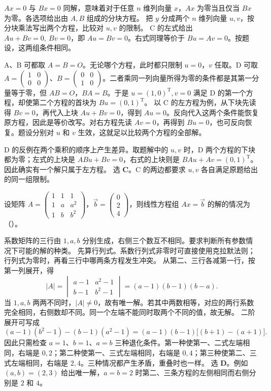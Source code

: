\documentclass[UTF8,zihao=-4,fontset=fandol]{ctexart}
\begin{document}
\Solution
\Known $Ax=0$ 与 $Bx=0$ 同解，意味着对于任意 $n$ 维列向量 $x$，$Ax$ 为零当且仅当 $Bx$ 为零。各选项给出由 $A,B$ 组成的分块方程。
\Method 把 $y$ 分成两个 $n$ 维列向量 $u,v$，按分块乘法写出两个方程，比较对 $u,v$ 的限制。
\Derive C 的左式给出 $Au+Bv=0,\ Bv=0$，即 $Au=Bv=0$。右式同理等价于 $Bu=Av=0$。按题设，这两组条件相同。

A、B 可都取 $A=B=O$。无论哪个方程，此时都只限制 $u=0$，$v$ 任取。D 可取 $A=\begin{pmatrix}1&0\\0&0\end{pmatrix}$、$B=\begin{pmatrix}0&0\\1&0\end{pmatrix}$。二者乘同一列向量所得为零的条件都是其第一分量等于零，但 $AB=O$，$BA=B$。于是 $u=(1,0)^{\mathrm T},v=0$ 满足 D 的第一个方程，却使第二个方程的首块为 $Bu=(0,1)^{\mathrm T}$。
以 C 的左方程为例，从下块先读得 $Bv=0$，再代入上块 $Au+Bv=0$，得到 $Au=0$。反向代入这两个条件能恢复原方程，因此是等价改写。对右方程先读 $Av=0$，再得到 $Bu=0$，也可反向恢复。题设分别对 $u$ 和 $v$ 生效，这就足以比较两个方程的全部解。

D 的反例在两个乘积的顺序上产生差异。取题解中的 $u,v$ 时，D 两个方程的下块都为零；左式的上块是 $ABu+Bv=0$，右式的上块则是 $BAu+Av=(0,1)^{\mathrm T}$。因此确实有一个解只属于左方程。
\Verify 选 \textbf{C}。C 的两边都要求 $u,v$ 各自满足原题给出的同一组限制。

设矩阵 $A=\begin{pmatrix}1&1&1\\1&a&a^2\\1&b&b^2\end{pmatrix}$，$\vec b=\begin{pmatrix}0\\2\\4\end{pmatrix}$，则线性方程组 $Ax=\vec b$ 的解的情况为（\quad）。

\Solution
\Known 系数矩阵的三行由 $1,a,b$ 分别生成，右侧三个数互不相同。要求判断所有参数情况下可能的解的种类。
\Method 先算行列式。系数行列式非零时可直接使用克拉默法则；行列式为零时，再看三行中哪两条方程发生冲突。
\Derive 从第二、三行各减第一行，按第一列展开，得
\[
|A|=\begin{vmatrix}a-1&a^2-1\\ b-1&b^2-1\end{vmatrix}
=(a-1)(b-1)(b-a).
\]
当 $1,a,b$ 两两不同时，$|A|\ne0$，故有唯一解。若其中两数相等，对应的两行系数完全相同，右侧数却不同。同一个左端不能同时取两个不同的值，故无解。
二阶展开可写成
\[
(a-1)(b^2-1)-(b-1)(a^2-1)
=(a-1)(b-1)\bigl[(b+1)-(a+1)\bigr].
\]
因此只需检查 $a=1$、$b=1$、$a=b$ 三种退化条件。第一种使第一、二式左端相同，右端是 $0,2$；第二种使第一、三式左端相同，右端是 $0,4$；第三种使第二、三式左端相同，右端是 $2,4$。三种情况都产生矛盾，重叠时也一样。
\Verify 选 \textbf{D}。例如 $(a,b)=(2,3)$ 给出唯一解，$a=b=2$ 时第二、三条方程的左侧相同而右侧分别是 $2$ 和 $4$。
\end{document}
